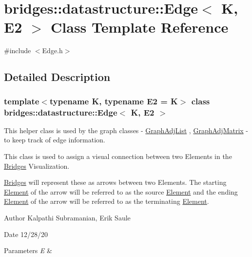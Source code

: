 \hypertarget{classbridges_1_1datastructure_1_1_edge}{}\section{bridges\+:\+:datastructure\+:\+:Edge$<$ K, E2 $>$ Class Template Reference}
\label{classbridges_1_1datastructure_1_1_edge}


{\ttfamily \#include $<$Edge.\+h$>$}



\subsection{Detailed Description}
\subsubsection*{template$<$typename K, typename E2 = K$>$\newline
class bridges\+::datastructure\+::\+Edge$<$ K, E2 $>$}

This helper class is used by the graph classes -\/ \hyperlink{classbridges_1_1datastructure_1_1_graph_adj_list}{Graph\+Adj\+List} , \hyperlink{classbridges_1_1datastructure_1_1_graph_adj_matrix}{Graph\+Adj\+Matrix} -\/ to keep track of edge information. 

This class is used to assign a visual connection between two Elements in the \hyperlink{classbridges_1_1_bridges}{Bridges} Visualization.

\hyperlink{classbridges_1_1_bridges}{Bridges} will represent these as arrows between two Elements. The starting \hyperlink{classbridges_1_1datastructure_1_1_element}{Element} of the arrow will be referred to as the source \hyperlink{classbridges_1_1datastructure_1_1_element}{Element} and the ending \hyperlink{classbridges_1_1datastructure_1_1_element}{Element} of the arrow will be referred to as the terminating \hyperlink{classbridges_1_1datastructure_1_1_element}{Element}.

\begin{DoxyAuthor}{Author}
Kalpathi Subramanian, Erik Saule
\end{DoxyAuthor}
\begin{DoxyDate}{Date}
12/28/20
\end{DoxyDate}

\begin{DoxyParams}{Parameters}
{\em E} & \\
\hline
\end{DoxyParams}
